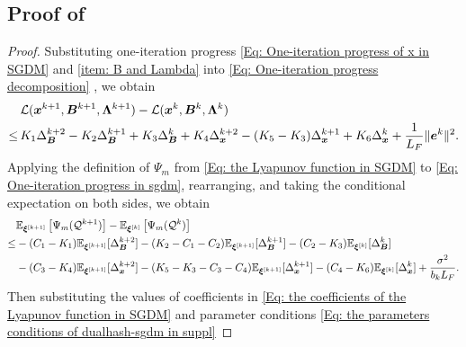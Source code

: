 \subsection{Proof of }
\label{Subsubsec: proof descent SGDM}
\begin{proof}
    Substituting one-iteration progress \eqref{Eq: One-iteration progress of x in SGDM}
    and \eqref{item: B and Lambda} into \eqref{Eq: One-iteration progress decomposition}
    , we obtain
    \begin{align}
        \label{Eq: One-iteration progress in sgdm} & \mathcal{L} (\bm{x}^{k+1}, \bm{B}^{k+1}, \bm{\Lambda}^{k+1}) - \mathcal{L} (\bm{x}^{k}, \bm{B}^{k}, \bm{\Lambda}^{k}) \notag                                                                                                   \\
        \leq \,                                    & K_{1}\Delta_{\bm{B}}^{k+2}- K_{2}\Delta_{\bm{B}}^{k+1}+ K_{3}\Delta_{\bm{B}}^{k}+ K_{4}\Delta_{\bm{x}}^{k+2}- (K_{5}- K_{3})\Delta_{\bm{x}}^{k+1}+ K_{6}\Delta_{\bm{x}}^{k}+ \frac{1}{L_{F}}\|\bm{e}^{k}\|^{2}.
    \end{align}
    Applying the definition of $\Psi_m$ from \eqref{Eq: the Lyapunov function in SGDM}
    to \eqref{Eq: One-iteration progress in sgdm}, rearranging, and taking the
    conditional expectation on both sides, we obtain
    {\small
    \begin{align}
        \label{the descent property of Lyapunov func in SGDM first} & \mathbb{E}_{\bm{\xi}^{[k+1]}}\left[\Psi_m(\mathcal{Q}^{k+1})\right] - \mathbb{E}_{\bm{\xi}^{[k]}}\left[\Psi_m(\mathcal{Q}^{k})\right]\notag                                                                               \\
        \leq                                                        & - (C_{1}- K_{1}) \mathbb{E}_{\bm{\xi}^{[k+1]}}[\Delta_{\bm{B}}^{k+2}] -(K_{2}- C_{1}- C_{2}) \mathbb{E}_{\bm{\xi}^{[k+1]}}[\Delta_{\bm{B}}^{k+1}] - (C_{2}- K_{3}) \mathbb{E}_{\bm{\xi}^{[k]}}[\Delta_{\bm{B}}^{k}] \notag                     \\
                                                                    & - (C_{3}-K_{4}) \mathbb{E}_{\bm{\xi}^{[k+1]}}[\Delta_{\bm{x}}^{k+2}]- (K_{5}-K_{3}-C_{3}-C_{4}) \mathbb{E}_{\bm{\xi}^{[k+1]}}[\Delta_{\bm{x}}^{k+1}] - (C_{4}- K_{6}) \mathbb{E}_{\bm{\xi}^{[k]}}[\Delta_{\bm{x}}^{k}] + \frac{\sigma^{2}}{b_{k}L_{F}}.
    \end{align}}Then substituting the values of coefficients in \eqref{Eq: the coefficients of the Lyapunov function in SGDM}
    and parameter conditions \eqref{Eq: the parameters conditions of dualhash-sgdm in suppl}

\end{proof}
